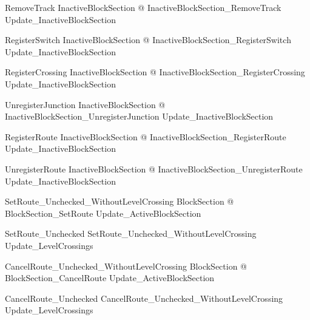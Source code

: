 \begin{zed}
RemoveTrack  \exists  \Delta InactiveBlockSection @ InactiveBlockSection\_RemoveTrack \land  Update\_InactiveBlockSection
\end{zed}

\begin{zed}
RegisterSwitch  \exists  \Delta InactiveBlockSection @ InactiveBlockSection\_RegisterSwitch \land  Update\_InactiveBlockSection
\end{zed}

\begin{zed}
RegisterCrossing  \exists  \Delta InactiveBlockSection @ InactiveBlockSection\_RegisterCrossing \land  Update\_InactiveBlockSection
\end{zed}

\begin{zed}
UnregisterJunction  \exists  \Delta InactiveBlockSection @ InactiveBlockSection\_UnregisterJunction \land  Update\_InactiveBlockSection
\end{zed}

\begin{zed}
RegisterRoute  \exists  \Delta InactiveBlockSection @ InactiveBlockSection\_RegisterRoute \land  Update\_InactiveBlockSection
\end{zed}

\begin{zed}
UnregisterRoute  \exists  \Delta InactiveBlockSection @ InactiveBlockSection\_UnregisterRoute \land  Update\_InactiveBlockSection
\end{zed}

\begin{zed}
SetRoute\_Unchecked\_WithoutLevelCrossing  \exists  \Delta BlockSection @ BlockSection\_SetRoute \land  Update\_ActiveBlockSection
\end{zed}

\begin{zed}
SetRoute\_Unchecked  SetRoute\_Unchecked\_WithoutLevelCrossing \semi  Update\_LevelCrossings
\end{zed}

\begin{zed}
CancelRoute\_Unchecked\_WithoutLevelCrossing  \exists  \Delta BlockSection @ BlockSection\_CancelRoute \land  Update\_ActiveBlockSection
\end{zed}

\begin{zed}
CancelRoute\_Unchecked  CancelRoute\_Unchecked\_WithoutLevelCrossing \semi  Update\_LevelCrossings
\end{zed}

